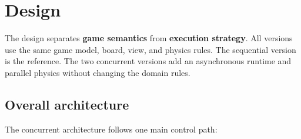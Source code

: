 \clearpage
\section{Design}

The design separates \textbf{game semantics} from \textbf{execution strategy}.
All versions use the same game model, board, view, and physics rules. The
sequential version is the reference. The two concurrent versions add an
asynchronous runtime and parallel physics without changing the domain rules.

\subsection{Overall architecture}

The concurrent architecture follows one main control path:

